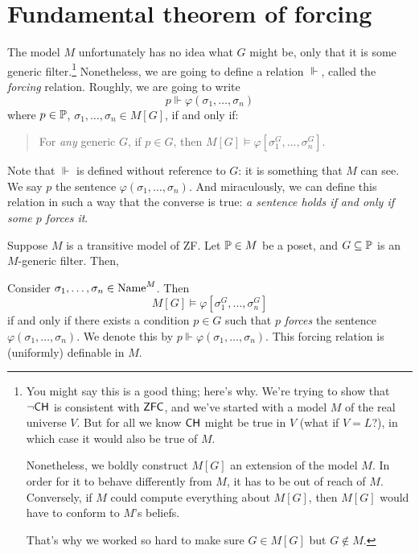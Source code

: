 \section{Fundamental theorem of forcing}
The model $M$ unfortunately has no idea what $G$ might be,
only that it is some generic filter.\footnote{You might
	say this is a good thing; here's why.
	We're trying to show that $\neg \mathsf{CH}$ is consistent with $\mathsf{ZFC}$,
	and we've started with a model $M$ of the real universe $V$.
	But for all we know $\mathsf{CH}$ might be true in $V$ (what if $V=L$?),
	in which case it would also be true of $M$.

	Nonetheless, we boldly construct $M[G]$ an extension of the model $M$.
	In order for it to behave differently from $M$, it has to be out of reach of $M$.
	Conversely, if $M$ could compute everything about $M[G]$,
	then $M[G]$ would have to conform to $M$'s beliefs.

	That's why we worked so hard to make sure $G \in M[G]$ but $G \notin M$.}
Nonetheless, we are going to define a relation $\Vdash$,
called the \emph{forcing} relation.
Roughly, we are going to write
\[ p \Vdash \varphi(\sigma_1, \dots, \sigma_n) \]
where $p \in \mathbb P$, $\sigma_1, \dots, \sigma_n \in M[G]$, if and only if:
\begin{quote}
	For \emph{any} generic $G$,
	if $p \in G$,
	then $M[G] \vDash \varphi[\sigma_1^G, \dots, \sigma_n^G]$.
\end{quote}
Note that $\Vdash$ is defined without reference to $G$:
it is something that $M$ can see.
We say $p$  the sentence $\varphi(\sigma_1, \dots, \sigma_n)$.
And miraculously, we can define this relation in such a way that the converse is true:
\emph{a sentence holds if and only if some $p$ forces it}.


\begin{theorem}
	Suppose $M$ is a transitive model of ZF.
	Let $\mathbb P \in M$ be a poset, and $G \subseteq \mathbb P$ is an $M$-generic filter.
	Then,
	\begin{enumerate}[(1)]
		\ii Consider $\sigma_1, \dots, \sigma_n \in \text{Name}^M$.
		Then
		\[ M[G] \vDash \varphi[\sigma_1^G, \dots, \sigma_n^G] \]
		if and only if there exists a condition $p \in G$
		such that $p$ \emph{forces} the sentence $\varphi(\sigma_1, \dots, \sigma_n)$.
		We denote this by $p \Vdash \varphi(\sigma_1, \dots, \sigma_n)$.
		\ii This forcing relation is (uniformly) definable in $M$.
	\end{enumerate}
\end{theorem}

